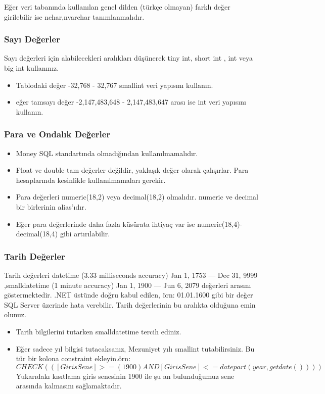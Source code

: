 \documentclass[10pt,a4paper,draft]{article}
\begin{document}
Eğer veri tabanında kullanılan genel dilden (türkçe olmayan) farklı değer girilebilir ise nchar,nvarchar tanımlanmalıdır.

\subsubsection{Sayı Değerler}
Sayı değerleri için alabilecekleri aralıkları düşünerek tiny int, short int , int veya big int kullanınız. 

\begin{itemize}
\item   Tablodaki değer  -32,768 - 32,767   smallint veri yapısını kullanın.
\item   eğer tamsayı değer  -2,147,483,648 - 2,147,483,647 arası ise int veri yapısını kullanın.
\end{itemize} 

\subsubsection{Para ve Ondalık Değerler}

\begin{itemize}
\item  Money SQL standartında olmadığından kullanılmamalıdır. 
\item  Float ve double tam değerler değildir, yaklaşık değer olarak çalışırlar. 
Para hesaplarında kesinlikle kullanılmamaları gerekir.
\item Para değerleri numeric(18,2) veya decimal(18,2) olmalıdır. numeric ve decimal bir birlerinin alias'ıdır. 
\item Eğer para değerlerinde daha fazla küsürata ihtiyaç var ise   numeric(18,4)-decimal(18,4) gibi artırılabilir. 

\end{itemize} 
 			
\subsubsection{Tarih Değerler}
Tarih değerleri 	datetime (3.33 milliseconds accuracy)  	Jan 1, 1753  --- Dec 31, 9999
,smalldatetime (1 minute accuracy) 	Jan 1, 1900  --- Jun 6, 2079		
değerleri arasını göstermektedir. 
.NET üstünde doğru kabul edilen, 
örn: 01.01.1600 gibi bir değer SQL Server üzerinde hata verebilir.
Tarih değerlerinin bu aralıkta olduğuna emin olunuz.

\begin{itemize}

\item Tarih bilgilerini tutarken smalldatetime tercih ediniz. 			
\item Eğer sadece  yıl bilgisi tutacaksanız, Mezuniyet yılı smallint tutabilirsiniz. 
Bu tür bir kolona constraint ekleyin.örn: 
  $  CHECK  (([GirisSene]>=(1900) AND   [GirisSene]<=datepart(year,getdate()))) $
Yukarıdakı kısıtlama giris senesinin 1900 ile şu an bulunduğumuz sene arasında kalmasını sağlamaktadır.
\end{itemize}  			
\end{document}
